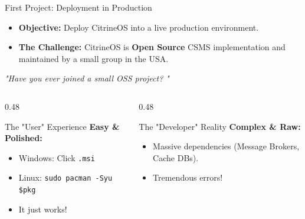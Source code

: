 \documentclass[11pt]{beamer}
\begin{document}
\begin{frame}{First Project: Deployment in Production}
    \begin{itemize}
        \item \textbf{Objective:} Deploy CitrineOS into a live production environment.
        \item \textbf{The Challenge:} CitrineOS is \textbf{Open Source} CSMS implementation and maintained by a small group in the USA.
    \end{itemize}

    \pause
    \begin{center}
        \textit{"Have you ever joined a small OSS project? "}
    \end{center}

    \begin{columns}
        \begin{column}{0.48\textwidth}
            \begin{block}{The "User" Experience}
                \small
                \textbf{Easy \& Polished:}
                \begin{itemize}
                    \item Windows: Click \texttt{.msi}
                    \item Linux: \texttt{sudo pacman -Syu \$pkg}
                    \item It just works!
                \end{itemize}
            \end{block}
        \end{column}
        \begin{column}{0.48\textwidth}
            \begin{alertblock}{The "Developer" Reality}
                \small
                \textbf{Complex \& Raw:}
                \begin{itemize}
                    \item Massive dependencies (Message Brokers, Cache DBs).
                    \item Tremendous errors!
                \end{itemize}
            \end{alertblock}
        \end{column}
    \end{columns}
\end{frame}
\end{document}
